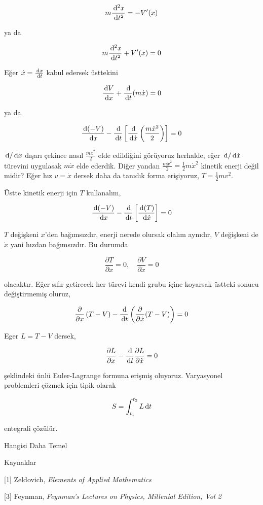 \documentclass[12pt,fleqn]{article}\usepackage{../../common}
\begin{document}
$$
m \frac{\,\mathrm{d}^2 x}{\,\mathrm{d} t^2} = -V'(x)
$$

ya da

$$
m \frac{\,\mathrm{d}^2 x}{\,\mathrm{d} t^2} + V'(x) = 0
$$

Eğer $\dot{x} = \frac{\,\mathrm{d} x}{\,\mathrm{d} t}$ kabul edersek üsttekini

$$
\frac{\,\mathrm{d} V}{\,\mathrm{d} x} + \frac{\,\mathrm{d}}{\,\mathrm{d} t} (m\dot{x}) = 0
$$

ya da

$$
\frac{\,\mathrm{d} (-V)}{\,\mathrm{d} x} -
\frac{\,\mathrm{d}}{\,\mathrm{d} t}
  \left[
     \frac{\,\mathrm{d} }{\,\mathrm{d} \dot{x}} \left( \frac{m\dot{x}^2}{2} \right)
  \right] =0 
$$

$\,\mathrm{d} / \,\mathrm{d} x$ dışarı çekince nasıl $\frac{m\dot{x}^2}{2}$ elde edildiğini
görüyoruz herhalde, eğer $\,\mathrm{d} / \,\mathrm{d} \dot{x}$ türevini uygulasak $m\dot{x}$
elde ederdik. Diğer yandan $\frac{m\dot{x}^2}{2} = \frac{1}{2} m\dot{x}^2 $
kinetik enerji değil midir? Eğer hız $v = \dot{x}$ dersek daha da tanıdık
forma erişiyoruz, $T = \frac{1}{2} mv^2$.

Üstte kinetik enerji için $T$ kullanalım,
  
$$
\frac{\,\mathrm{d} (-V)}{\,\mathrm{d} x} -
\frac{\,\mathrm{d}}{\,\mathrm{d} t}
  \left[ \frac{\,\mathrm{d} (T)}{\,\mathrm{d} \dot{x}} \right] =0 
$$


$T$ değişkeni $x$'den bağımsızdır, enerji nerede olursak olalım aynıdır, $V$
değişkeni de $\dot{x}$ yani hızdan bağımsızdır. Bu durumda

$$
\frac{\partial T}{\partial x} = 0, \quad
\frac{\partial V}{\partial \dot{x}} = 0
$$

olacaktır. Eğer sıfır getirecek her türevi kendi grubu içine koyarsak üstteki
sonucu değiştirmemiş oluruz,

$$
\frac{\partial }{\partial x} \left( T - V  \right) -
\frac{\,\mathrm{d}}{\,\mathrm{d} t} \left( \frac{\partial }{\partial \dot{x}} (T - V)  \right) = 0
$$

Eger $L = T - V$ dersek,

$$
\frac{\partial L}{\partial x} - \frac{\,\mathrm{d}}{\,\mathrm{d} t} \frac{\partial L}{\partial \dot{x}} = 0
$$

şeklindeki ünlü Euler-Lagrange formuna erişmiş oluyoruz. Varyasyonel problemleri
çözmek için tipik olarak

$$
S = \int_{t_1}^{t_2} L \,\mathrm{d} t
$$

entegrali çözülür.

Hangisi Daha Temel



Kaynaklar 

[1] Zeldovich, {\em Elements of Applied Mathematics}

[3] Feynman, {\em Feynman's Lectures on Physics, Millenial Edition, Vol 2}
\end{document}

